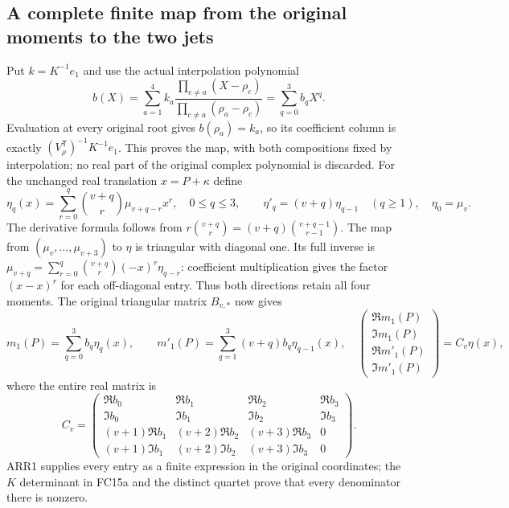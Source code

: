 \documentclass[11pt]{article}
\begin{document}
\subsection{A complete finite map from the original moments to the two jets}
Put $k=K^{-1}e_1$ and use the actual interpolation polynomial
\[
 b(X)=\sum_{a=1}^4 k_a
       \frac{\prod_{c\ne a}(X-\rho_c)}
            {\prod_{c\ne a}(\rho_a-\rho_c)}
      =\sum_{q=0}^3 b_qX^q.
 \tag{ARR1}
\]
Evaluation at every original root gives $b(\rho_a)=k_a$, so its
coefficient column is exactly $(V_\rho^{\mathsf T})^{-1}K^{-1}e_1$.
This proves the map, with both compositions fixed by interpolation;
no real part of the original complex polynomial is discarded.
For the unchanged real translation $x=P+\kappa$ define
\[
 \eta_q(x)=\sum_{r=0}^q\binom{v+q}{r}\mu_{v+q-r}x^r,
 \quad0\le q\le3,\qquad
 \eta'_q=(v+q)\eta_{q-1}\quad(q\ge1),\quad\eta_0=\mu_v.
 \tag{ARR2}
\]
The derivative formula follows from
$r\binom{v+q}{r}=(v+q)\binom{v+q-1}{r-1}$.
The map from $(\mu_v,\ldots,\mu_{v+3})$ to $\eta$ is triangular
with diagonal one. Its full inverse is
$\mu_{v+q}=\sum_{r=0}^q\binom{v+q}{r}(-x)^r\eta_{q-r}$:
coefficient multiplication gives the factor $(x-x)^r$ for each
off-diagonal entry. Thus both directions retain all four moments.
The original triangular matrix $B_{v,*}$ now gives
\[
 m_1(P)=\sum_{q=0}^3b_q\eta_q(x),\qquad
 m'_1(P)=\sum_{q=1}^3(v+q)b_q\eta_{q-1}(x),
 \quad
 \begin{pmatrix}\Re m_1(P)\\\Im m_1(P)\\
 \Re m'_1(P)\\\Im m'_1(P)\end{pmatrix}=C_v\eta(x),
 \tag{ARR3}
\]
where the entire real matrix is
\[
 C_v=\begin{pmatrix}
 \Re b_0&\Re b_1&\Re b_2&\Re b_3\\
 \Im b_0&\Im b_1&\Im b_2&\Im b_3\\
 (v+1)\Re b_1&(v+2)\Re b_2&(v+3)\Re b_3&0\\
 (v+1)\Im b_1&(v+2)\Im b_2&(v+3)\Im b_3&0
 \end{pmatrix}.
 \tag{ARR4}
\]
ARR1 supplies every entry as a finite expression in the original
coordinates; the $K$ determinant in FC15a and the distinct quartet
prove that every denominator there is nonzero.
\end{document}
